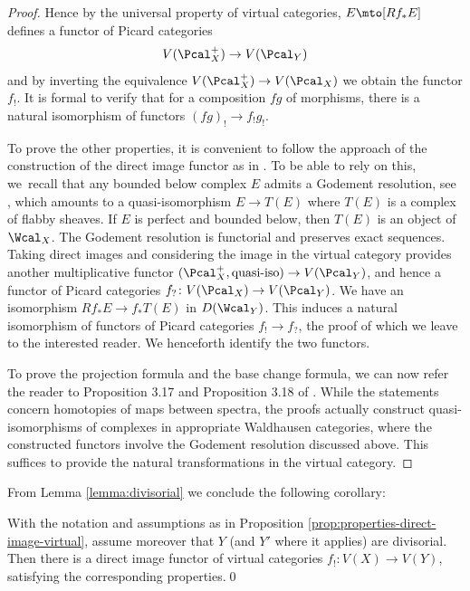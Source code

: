 \begin{proof}
Hence by the universal property of virtual categories, $E \mto [Rf_\ast E]$ defines a functor of Picard categories
\begin{displaymath}
V(\Pcal_{X}^{+}) \to V(\Pcal_{Y})
\end{displaymath}
and by inverting the equivalence $V(\Pcal^+_X) \to V(\Pcal_X)$ we obtain the functor $f_!$. It is formal to verify that for a composition $fg$ of morphisms, there is a natural isomorphism of functors $(fg)_! \to f_! g_! $.

To prove the other properties, it is convenient to follow the approach of the construction of the direct image functor as in \cite[]{ThomasonTrobaugh}. To be able to rely on this, we~recall that any bounded below complex $E$ admits a Godement resolution, see \hbox{\cite[\href{https://stacks.math.columbia.edu/tag/0FKT}{0FKT}]{stacks-project}}, which amounts to a quasi-isomorphism $E\to T(E)$ where $T(E)$ is a complex of flabby sheaves. If $E$ is perfect and bounded below, then $T(E)$ is an object of $\Wcal_{X}$. The Godement resolution is functorial and preserves exact sequences. Taking direct images and considering the image in the virtual category provides another multiplicative functor $(\Pcal_{X}^{+}, \hbox{quasi-iso}) \to V(\Pcal_{Y})$, and hence a functor of Picard categories $f_{?}\colon V(\Pcal_{X})\to V(\Pcal_{Y})$. We have an isomorphism $Rf_\ast E \to f_\ast T(E)$ in $D(\Wcal_{Y})$. This induces a natural isomorphism of functors of Picard categories $f_! \to f_?$, the proof of which we leave to the interested reader. We henceforth identify the two functors.

To prove the projection formula and the base change formula, we can now refer the reader to Proposition 3.17 and Proposition 3.18 of \cite{ThomasonTrobaugh}. While the statements concern homotopies of maps between spectra, the proofs actually construct quasi-isomorphisms of complexes in appropriate Waldhausen categories, where the constructed functors involve the Godement resolution discussed above. This suffices to provide the natural transformations in the virtual category.
\end{proof}

From Lemma \ref{lemma:divisorial} we conclude the following corollary:

\begin{corollary}
With the notation and assumptions as in Proposition \ref{prop:properties-direct-image-virtual}, assu\-me moreover that $Y$ (and $Y'$ where it applies) are divisorial. Then there is a
direct image functor of virtual categories $f_! \colon V(X)\to V(Y)$, satisfying the corresponding properties.\qed
\end{corollary}

